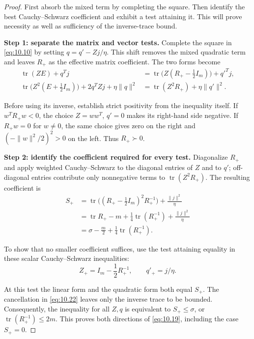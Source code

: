 \begin{proof}
First absorb the mixed term by completing the square. Then identify
the best Cauchy--Schwarz coefficient and exhibit a test attaining it. This will
prove necessity as well as sufficiency of the inverse-trace bound.

\textbf{Step 1: separate the matrix and vector tests.} Complete the square in
\eqref{eq:10.10} by setting $q=q'-Zj/\eta$. This shift removes the mixed quadratic term
and leaves $R_+$ as the effective matrix coefficient. The two forms become
\begin{equation}\label{eq:10.21}
\begin{aligned}
\operatorname{tr}(ZE)+q^Tj
&=\operatorname{tr}\bigl(Z(R_+-\tfrac12I_m)\bigr)+q'^Tj,\\
\operatorname{tr}\bigl(Z^2(E+\tfrac12I_m)\bigr)+2q^TZj+\eta\|q\|^2
&=\operatorname{tr}(Z^2R_+)+\eta\|q'\|^2.
\end{aligned}
\end{equation}

Before using its inverse, establish strict positivity from the inequality
itself. If $w^TR_+w<0$, the choice $Z=ww^T$, $q'=0$ makes its right-hand side
negative. If $R_+w=0$ for $w\ne0$, the same choice gives zero on the right and
$(-\|w\|^2/2)^2>0$ on the left. Thus $R_+\succ0$.

\textbf{Step 2: identify the coefficient required for every test.}
Diagonalize $R_+$ and apply weighted Cauchy--Schwarz to the diagonal entries
of $Z$ and to $q'$; off-diagonal entries contribute only nonnegative terms to
$\operatorname{tr}(Z^2R_+)$. The resulting coefficient is
\begin{equation}\label{eq:10.22}
\begin{aligned}
S_+
&=\operatorname{tr}\bigl((R_+-\tfrac12I_m)^2R_+^{-1}\bigr)
+\frac{\|j\|^2}{\eta}\\
&=\operatorname{tr}R_+-m+\frac14\operatorname{tr}(R_+^{-1})
+\frac{\|j\|^2}{\eta}\\
&=\sigma-\frac m2+\frac14\operatorname{tr}(R_+^{-1}).
\end{aligned}
\end{equation}

To show that no smaller coefficient suffices, use the test attaining equality
in these scalar Cauchy--Schwarz inequalities:
\begin{equation}\label{eq:10.23}
Z_+=I_m-\frac12R_+^{-1},\qquad q'_+=j/\eta.
\end{equation}

At this test the linear form and the quadratic form both equal $S_+$.
The cancellation in \eqref{eq:10.22} leaves only the inverse trace to be bounded.
Consequently, the inequality for all $Z,q$ is equivalent to $S_+\le\sigma$, or
$\operatorname{tr}(R_+^{-1})\le2m$. This proves both directions of \eqref{eq:10.19}, including the case $S_+=0$.


\end{proof}
